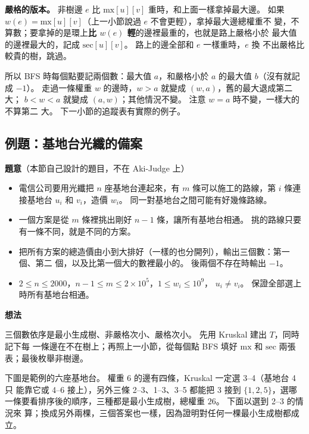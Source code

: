 \textbf{嚴格的版本。} 非樹邊 $e$ 比 $\mathrm{mx}[u][v]$ 重時，和上面一樣拿掉最大邊。
如果 $w(e) = \mathrm{mx}[u][v]$（上一小節說過 $e$ 不會更輕），拿掉最大邊總權重不
變，不算數；要拿掉的是環上\textbf{比 $w(e)$ 輕}的邊裡最重的，也就是路上嚴格小於
最大值的邊裡最大的，記成 $\mathrm{sec}[u][v]$。 路上的邊全部和 $e$ 一樣重時，$e$ 換
不出嚴格比較貴的樹，跳過。

所以 BFS 時每個點要記兩個數：最大值 $a$，和嚴格小於 $a$ 的最大值 $b$（沒有就記成
$-1$）。 走過一條權重 $w$ 的邊時，$w > a$ 就變成 $(w, a)$，舊的最大退成第二大；
$b < w < a$ 就變成 $(a, w)$；其他情況不變。 注意 $w = a$ 時不變，一樣大的不算第二
大。 下一小節的追蹤表有實際的例子。

\subsection{例題：基地台光纖的備案}
\label{sec:ex-backup}

\textbf{題意}（本節自己設計的題目，不在 Aki-Judge 上）

\begin{itemize}
\item 電信公司要用光纖把 $n$ 座基地台連起來，有 $m$ 條可以施工的路線，第 $i$ 條連
接基地台 $u_i$ 和 $v_i$，造價 $w_i$。 同一對基地台之間可能有好幾條路線。
\item 一個方案是從 $m$ 條裡挑出剛好 $n - 1$ 條，讓所有基地台相通。 挑的路線只要
有一條不同，就是不同的方案。
\item 把所有方案的總造價由小到大排好（一樣的也分開列），輸出三個數：第一個、第二
個，以及比第一個大的數裡最小的。 後兩個不存在時輸出 $-1$。
\item $2 \le n \le 2000$，$n - 1 \le m \le 2 \times 10^5$，$1 \le w_i \le 10^9$，
$u_i \ne v_i$。 保證全部選上時所有基地台相通。
\end{itemize}

\textbf{想法}

三個數依序是最小生成樹、非嚴格次小、嚴格次小。 先用 Kruskal 建出 $T$，同時記下每
一條邊在不在樹上；再照上一小節，從每個點 BFS 填好 $\mathrm{mx}$ 和 $\mathrm{sec}$
兩張表；最後枚舉非樹邊。

下圖是範例的六座基地台。 權重 $6$ 的邊有四條，Kruskal 一定選 3--4（基地台 4 只
能靠它或 4--6 接上），另外三條 2--3、1--3、3--5 都能把 3 接到 $\{1, 2, 5\}$，選哪
一條要看排序後的順序，三種都是最小生成樹，總權重 $26$。 下面以選到 2--3 的情況來
算；換成另外兩棵，三個答案也一樣，因為證明對任何一棵最小生成樹都成立。

